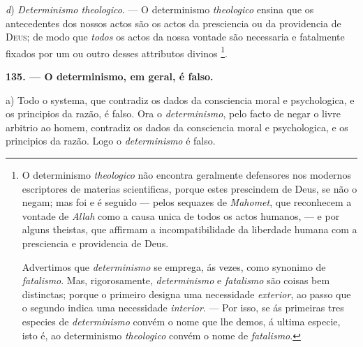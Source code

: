 \emph{d}) \emph{Determinismo theologico}. --- O determinismo \emph{theologico} ensina que os antecedentes dos nossos actos são os actos da presciencia ou da providencia de \textsc{Deus}; de modo que \emph{todos} os actos da nossa vontade são necessaria e fatalmente fixados por um ou outro desses attributos divinos \footnote{O determinismo \emph{theologico} não encontra geralmente defensores nos modernos escriptores de materias scientificas, porque estes prescindem de Deus, se não o negam; mas foi e é seguido --- pelos sequazes de \emph{Mahomet}, que reconhecem a vontade de \emph{Allah} como a causa unica de todos os actos humanos, --- e por alguns theistas, que affirmam a incompatibilidade da liberdade humana com a presciencia e providencia de Deus.\par Advertimos que \emph{determinismo} se emprega, ás vezes, como synonimo de \emph{fatalismo}. Mas, rigorosamente, \emph{determinismo} e \emph{fatalismo} são coisas bem distinctas; porque o primeiro designa uma necessidade \emph{exterior}, ao passo que o segundo indica uma necessidade \emph{interior}. --- Por isso, se ás primeiras tres especies de \emph{determinismo} convém o nome que lhe demos, á ultima especie, isto é, ao determinismo \emph{theologico} convém o nome de \emph{fatalismo}.}.

\textbf{135. --- O determinismo, em geral, é falso.}

a) Todo o systema, que contradiz os dados da consciencia moral e psychologica, e os principios da razão, é falso. Ora o \emph{determinismo}, pelo facto de negar o livre arbitrio ao homem, contradiz os dados da consciencia moral e psychologica, e os principios da razão. Logo o \emph{determinismo} é falso.

